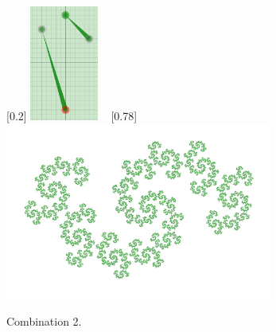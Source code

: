             \begin{figure}[H]
                \centering
                \caption{\label{ray_06} Combination 2.}
                [0.2\textwidth]
                    {\includegraphics[width=0.2\textwidth]{img/Simple_Techniques/Cases/rays/ray_set_06.png}}
                ~
                [0.78\textwidth]
                    {\includegraphics[width=0.78\textwidth]{img/Simple_Techniques/Cases/rays/ray_06.png}}
            \end{figure}

